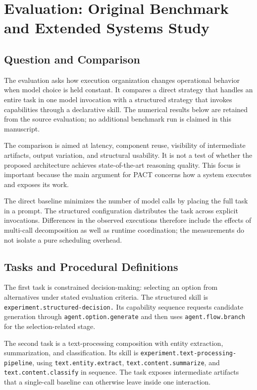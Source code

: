 \documentclass[10pt,twocolumn,a4paper]{article}
\begin{document}
\section{Evaluation: Original Benchmark and Extended Systems Study}

\subsection{Question and Comparison}

The evaluation asks how execution organization changes operational behavior when model choice is held constant. It compares a direct strategy that handles an entire task in one model invocation with a structured strategy that invokes capabilities through a declarative skill. The numerical results below are retained from the source evaluation; no additional benchmark run is claimed in this manuscript.


The comparison is aimed at latency, component reuse, visibility of intermediate artifacts, output variation, and structural usability. It is not a test of whether the proposed architecture achieves state-of-the-art reasoning quality. This focus is important because the main argument for PACT concerns how a system executes and exposes its work.


The direct baseline minimizes the number of model calls by placing the full task in a prompt. The structured configuration distributes the task across explicit invocations. Differences in the observed executions therefore include the effects of multi-call decomposition as well as runtime coordination; the measurements do not isolate a pure scheduling overhead.


\subsection{Tasks and Procedural Definitions}

The first task is constrained decision-making: selecting an option from alternatives under stated evaluation criteria. The structured skill is {\small{}\nolinkurl{experiment.structured-decision.}} Its capability sequence requests candidate generation through {\small{}\nolinkurl{agent.option.generate}} and then uses {\small{}\nolinkurl{agent.flow.branch}} for the selection-related stage.


The second task is a text-processing composition with entity extraction, summarization, and classification. Its skill is {\small{}\nolinkurl{experiment.text-processing-pipeline}}, using {\small{}\nolinkurl{text.entity.extract}}, {\small{}\nolinkurl{text.content.summarize}}, and {\small{}\nolinkurl{text.content.classify}} in sequence. The task exposes intermediate artifacts that a single-call baseline can otherwise leave inside one interaction.
\end{document}
